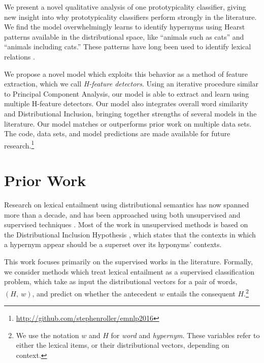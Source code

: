 We present a novel qualitative analysis of one prototypicality
classifier, giving new insight into why prototypicality classifiers perform strongly in
the literature. We find the model overwhelmingly learns to identify hypernyms
using Hearst patterns available in the distributional space, like ``animals such as cats'' and ``animals
including cats.''  These patterns have long been used to identify lexical
relations \cite{hearst:1992:coling,snow:2004:nips}.

We propose a novel model which exploits this behavior as a method of feature
extraction, which we call {\em H-feature detectors}. Using an iterative procedure
similar to Principal Component Analysis, our model is able to extract and learn
using multiple H-feature detectors. Our model also integrates overall word
similarity and Distributional Inclusion, bringing together strengths of several
models in the literature. Our model matches or outperforms prior work on
multiple data sets. The code, data sets, and model predictions are made available
for future research.\footnote{\url{http://github.com/stephenroller/emnlp2016}}

\section{Prior Work}

Research on lexical entailment using distributional semantics has now spanned
more than a decade, and has been approached using both unsupervised
\cite{weeds:2004:coling,kotlerman:2010:nle,lenci:2012:starsem,santus:2013:thesis}
and supervised techniques
\cite{baroni:2012:eacl,fu:2014:acl,roller:2014:coling,weeds:2014:coling,kruszewski:2015:tacl,levy:2015:naacl,turney:2015:nle,santus:2016:lrec}.
Most of the work in unsupervised methods is based on the Distributional
Inclusion Hypothesis \cite{weeds:2004:coling,zhitomirskygeffet:2005:acl}, which states that the contexts
in which a hypernym appear should be a superset over its hyponyms' contexts.

This work focuses primarily on the supervised works in the literature.
Formally, we consider methods which treat lexical entailment as a supervised
classification problem, which take as input the distributional vectors for a
pair of words, $(H,~w)$, and predict on whether the antecedent $w$ entails the
consequent $H$.\footnote{We use the notation $w$ and $H$ for {\em word} and
{\em hypernym}. These variables refer to either the lexical items, or their
distributional vectors, depending on context.}

